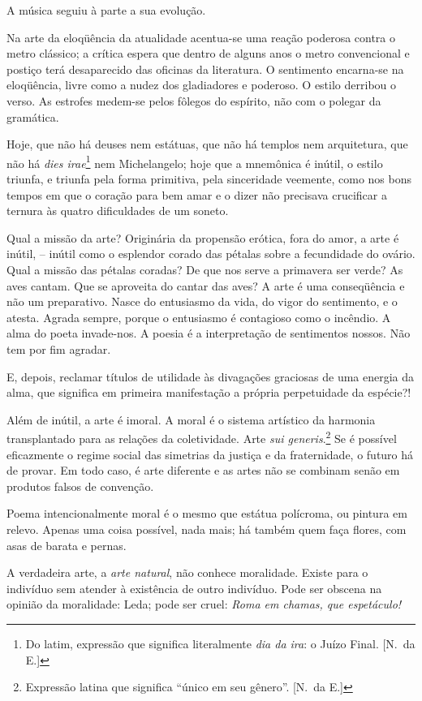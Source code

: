 A música seguiu à parte a sua evolução. 

Na arte da eloqüência da atualidade acentua{}-se uma reação poderosa contra o
metro clássico; a crítica espera que dentro de alguns anos o metro
convencional e postiço terá desaparecido das oficinas da literatura. O
sentimento encarna{}-se na eloqüência, livre como a nudez dos
gladiadores e poderoso. O estilo derribou o verso. As estrofes
medem{}-se pelos fôlegos do espírito, não com o polegar da gramática.

Hoje, que não há deuses nem estátuas, que não há templos nem
arquitetura, que não há \textit{dies irae}\footnote{ Do latim, expressão que 
significa literalmente \textit{dia da ira}: o Juízo Final. [N.~da E.]} 
nem Michelangelo; hoje que a
mnemônica é inútil, o estilo triunfa, e triunfa pela forma primitiva,
pela sinceridade veemente, como nos bons tempos em que o coração para
bem amar e o dizer não precisava crucificar a ternura às quatro
dificuldades de um soneto. 

Qual a missão da arte? Originária da
propensão erótica, fora do amor, a arte é inútil, -- inútil como o
esplendor corado das pétalas sobre a fecundidade do ovário. Qual a
missão das pétalas coradas? De que nos serve a primavera ser verde? As
aves cantam. Que se aproveita do cantar das aves? A arte é uma
conseqüência e não um preparativo. Nasce do entusiasmo da vida, do
vigor do sentimento, e o atesta. Agrada sempre, porque o entusiasmo é
contagioso como o incêndio. A alma do poeta invade{}-nos. 
A poesia é a interpretação de sentimentos nossos. Não tem por fim
agradar. 

E, depois, reclamar títulos de utilidade às divagações
graciosas de uma energia da alma, que significa em primeira
manifestação a própria perpetuidade da espécie?! 

Além de inútil, a arte
é imoral. A moral é o sistema artístico da harmonia transplantado para
as relações da coletividade. Arte \textit{sui generis}.\footnote{ Expressão latina 
que significa ``único em seu gênero''. [N.~da E.]} Se é possível
eficazmente o regime social das simetrias da justiça e da fraternidade,
o futuro há de provar. Em todo caso, é arte diferente e as artes não se
combinam senão em produtos falsos de convenção. 

Poema intencionalmente
moral é o mesmo que estátua polícroma, ou pintura em relevo. Apenas uma
coisa possível, nada mais; há também quem faça flores, com asas de
barata e pernas. 

A verdadeira arte, a \textit{arte natural}, não conhece
moralidade. Existe para o indivíduo sem atender à existência de outro
indivíduo. Pode ser obscena na opinião da moralidade: Leda; pode ser
cruel: \textit{Roma em chamas, que espetáculo!} 

